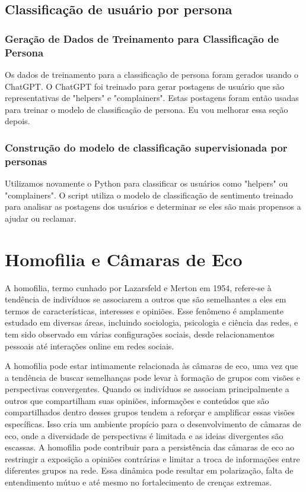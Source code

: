 \subsection{Classificação de usuário por persona}

\subsubsection*{Geração de Dados de Treinamento para Classificação de Persona}

Os dados de treinamento para a classificação de persona foram gerados usando o ChatGPT. O ChatGPT foi treinado para gerar postagens de usuário que são representativas de "helpers" e "complainers". Estas postagens foram então usadas para treinar o modelo de classificação de persona. Eu vou melhorar essa seção depois.

\subsubsection*{Construção do modelo de classificação supervisionada por personas}

Utilizamos novamente o Python para classificar os usuários como "helpers" ou "complainers". O script utiliza o modelo de classificação de sentimento treinado para analisar as postagens dos usuários e determinar se eles são mais propensos a ajudar ou reclamar.

\section{Homofilia e Câmaras de Eco}

A homofilia, termo cunhado por Lazarsfeld e Merton em 1954, refere-se à tendência de indivíduos se associarem a outros que são semelhantes a eles em termos de características, interesses e opiniões. Esse fenômeno é amplamente estudado em diversas áreas, incluindo sociologia, psicologia e ciência das redes, e tem sido observado em várias configurações sociais, desde relacionamentos pessoais até interações online em redes sociais.

A homofilia pode estar intimamente relacionada às câmaras de eco, uma vez que a tendência de buscar semelhanças pode levar à formação de grupos com visões e perspectivas convergentes. Quando os indivíduos se associam principalmente a outros que compartilham suas opiniões, informações e conteúdos que são compartilhados dentro desses grupos tendem a reforçar e amplificar essas visões específicas. Isso cria um ambiente propício para o desenvolvimento de câmaras de eco, onde a diversidade de perspectivas é limitada e as ideias divergentes são escassas. A homofilia pode contribuir para a persistência das câmaras de eco ao restringir a exposição a opiniões contrárias e limitar a troca de informações entre diferentes grupos na rede. Essa dinâmica pode resultar em polarização, falta de entendimento mútuo e até mesmo no fortalecimento de crenças extremas.


